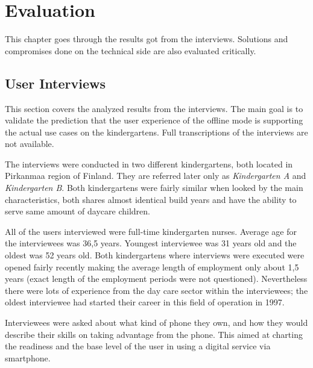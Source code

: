\chapter{Evaluation}
\label{chap:evaluation}

This chapter goes through the results got from the interviews. Solutions and compromises done on the technical side are also evaluated critically.


\section{User Interviews}


This section covers the analyzed results from the interviews. The main goal is to validate the prediction that the user experience of the offline mode is supporting the actual use cases on the kindergartens. Full transcriptions of the interviews are not available.

The interviews were conducted in two different kindergartens, both located in Pirkanmaa region of Finland. They are referred later only as \textit{Kindergarten A} and \textit{Kindergarten B}. Both kindergartens were fairly similar when looked by the main characteristics, both shares almost identical build years and have the ability to serve same amount of daycare children.

All of the users interviewed were full-time kindergarten nurses. Average age for the interviewees was 36,5 years. Youngest interviewee was 31 years old and the oldest was 52 years old. Both kindergartens where interviews were executed were opened fairly recently making the average length of employment only about 1,5 years (exact length of the employment periods were not questioned). Nevertheless there were lots of experience from the day care sector within the interviewees; the oldest interviewee had started their career in this field of operation in 1997.

Interviewees were asked about what kind of phone they own, and how they would describe their skills on taking advantage from the phone. This aimed at charting the readiness and the base level of the user in using a digital service via smartphone. 

